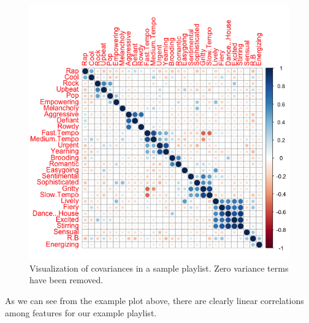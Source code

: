 \documentclass[a4paper,11pt]{kth-mag}
\begin{document}
\begin{figure}
\includegraphics[scale=0.6]{images/0removedPlistFeaturePlot.png}
\caption{Visualization of covariances in a sample playlist. Zero variance terms have been removed.}
\end{figure}


As we can see from the example plot above, there are clearly linear correlations among features for our example playlist.
\end{document}
